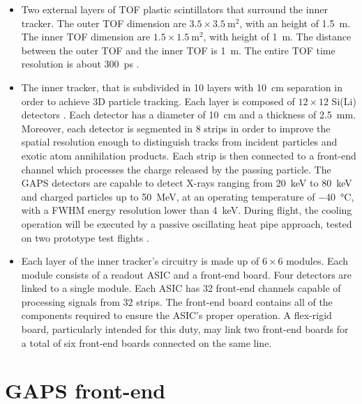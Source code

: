 \begin{itemize}
    \itemsep0em
    \item Two external layers of TOF plastic scintillators that surround the inner tracker. The outer TOF dimension are $3.5 \times \SI{3.5}{\metre\squared}$, with an height of \SI{1.5}{\metre}. The inner TOF dimension are $1.5 \times \SI{1.5}{\metre\squared}$, with height of \SI{1}{\metre}. The distance between the outer TOF and the inner TOF is \SI{1}{\metre}. The entire TOF time resolution is about \SI{300}{\pico\second} \cite{doetinchem_2020_cosmicray}.
    \item The inner tracker, that is subdivided in 10 layers with \SI{10}{\cm} separation in order to achieve 3D particle tracking. Each layer is composed of $12 \times 12$ Si(Li) detectors \cite{spieler_2014_semiconductor}. Each detector has a diameter of \SI{10}{\cm} and a thickness of \SI{2.5}{\mm}. Moreover, each detector is segmented in 8 strips in order to improve the spatial resolution enough to distinguish tracks from incident particles and exotic atom annihilation products. Each strip is then connected to a front-end channel which processes the charge released by the passing particle. The GAPS detectors are capable to detect X-rays ranging from \SI{20}{\kilo\electronvolt} to \SI{80}{\kilo\electronvolt} and charged particles up to \SI{50}{\mega\electronvolt}, at an operating temperature of \SI{-40}{\celsius}, with a FWHM energy resolution lower than \SI{4}{\kilo\electronvolt}. During flight, the cooling operation will be executed by a passive oscillating heat pipe approach, tested on two prototype test flights \cite{okazaki_2014_development}.
    \item Each layer of the inner tracker's circuitry is made up of $6 \times 6$ modules. Each module consists of a readout ASIC and a front-end board. Four detectors are linked to a single module. Each ASIC has 32 front-end channels capable of processing signals from 32 strips. The front-end board contains all of the components required to ensure the ASIC's proper operation. A flex-rigid board, particularly intended for this duty, may link two front-end boards for a total of six front-end boards connected on the same line.
\end{itemize}


\section{GAPS front-end}
\label{secGAPSfrontend}

